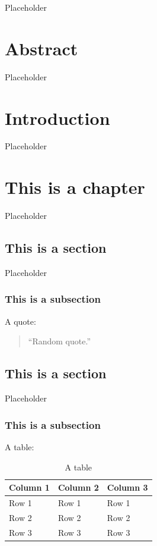 \documentclass[12pt]{book}
\renewcommand{\&}{\textup{\symbol{`\&}}}
\begin{document}
Placeholder

\thispagestyle{empty}



\chapter*{Abstract}

Placeholder

\tableofcontents
\listoffigures
\listoftables

\chapter{Introduction}
\label{ch:intro}
\renewcommand{\thepage}{\arabic{page}}

Placeholder

\chapter{This is a chapter}
\label{background}

Placeholder

\section{This is a section}
\label{sec:section}

Placeholder

\subsection{This is a subsection}
\label{subsec:subsection}

A quote:

\begin{quotation}
  ``Random quote.''
\end{quotation}

\section{This is a section}
\label{sec:section}

Placeholder

\subsection{This is a subsection}
\label{subsec:subsection}

A table:

\begin{table}[H]
  \centering
  \begin{tabular}{|l|l|l|}
    \hline
    \textbf{Column 1} & \textbf{Column 2} & \textbf{Column 3} \\ \hline
    Row 1             & Row 1             & Row 1             \\ \hline
    Row 2             & Row 2             & Row 2             \\ \hline
    Row 3             & Row 3             & Row 3             \\ \hline
  \end{tabular}
  \caption{A table}
  \label{tab:table}
\end{table}
\end{document}
